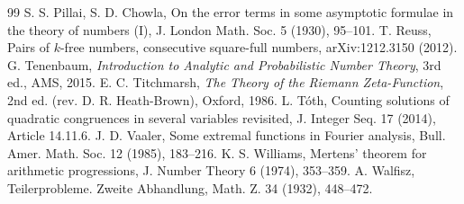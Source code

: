 \documentclass[11pt]{amsart}
\theoremstyle{remark}
\begin{document}
\begin{thebibliography}{99}
 S. S. Pillai, S. D. Chowla, On the error terms in some asymptotic formulae in the theory of numbers (I), J. London Math. Soc. 5 (1930), 95--101.
 T. Reuss, Pairs of $k$-free numbers, consecutive square-full numbers, arXiv:1212.3150 (2012).
 G. Tenenbaum, \emph{Introduction to Analytic and Probabilistic Number Theory}, 3rd ed., AMS, 2015.
 E. C. Titchmarsh, \emph{The Theory of the Riemann Zeta-Function}, 2nd ed. (rev. D. R. Heath-Brown), Oxford, 1986.
 L. T\'oth, Counting solutions of quadratic congruences in several variables revisited, J. Integer Seq. 17 (2014), Article 14.11.6.
 J. D. Vaaler, Some extremal functions in Fourier analysis, Bull. Amer. Math. Soc. 12 (1985), 183--216.
 K. S. Williams, Mertens' theorem for arithmetic progressions, J. Number Theory 6 (1974), 353--359.
 A. Walfisz, Teilerprobleme. Zweite Abhandlung, Math. Z. 34 (1932), 448--472.
\end{thebibliography}
\end{document}
